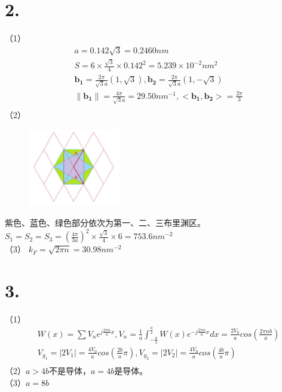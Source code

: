 \documentclass[UTF8]{ctexart}
\begin{document}
\section*{2.}
（1）
\begin{equation*}
    \begin{aligned}
        & a = 0.142\sqrt3=0.2460nm\\
        & S = 6\times\frac{\sqrt3}{4}\times0.142^2=5.239\times10^{-2}nm^2\\
        & \bm{b_1} = \frac{2\pi}{\sqrt3a}(1,\sqrt3),\bm{b_2} = \frac{2\pi}{\sqrt3a}(1,-\sqrt3)\\
        & \lVert \bm{b_1} \rVert = \frac{4\pi}{\sqrt3a} = 29.50nm^{-1}, <\bm{b_1}, \bm{b_2}> = \frac{2\pi}{3}\\
    \end{aligned}
\end{equation*}
（2）
\begin{figure}                               
\includegraphics[width=4cm]{图3.jpg}                  
\caption*{}                                              
\end{figure}                                          
紫色、蓝色、绿色部分依次为第一、二、三布里渊区。\\
$S_1=S_2=S_3=(\frac{4\pi}{3a})^2\times\frac{\sqrt3}{4}\times6=753.6nm^{-2}$\\
（3）
$k_F = \sqrt{2\pi n} = 30.98nm^{-2}$\\
\section*{3.}
（1）
\begin{equation*}
    \begin{aligned}
        &W(x) = \sum V_n e^{j\frac{2\pi n}{a}x}, V_n = \frac{1}{a}\int_{-\frac{a}{2}}^{\frac{a}{2}}W(x)e^{-j\frac{2\pi n}{a}x}dx 
        =\frac{2V_0}{a}cos(\frac{2\pi nb}{a})\\
        &V_{g_1} = \lvert 2V_1\rvert = \frac{4V_0}{a}cos(\frac{2b}{a}\pi), 
        V_{g_2} = \lvert 2V_2\rvert = \frac{4V_0}{a}cos(\frac{4b}{a}\pi)\\
    \end{aligned}
\end{equation*}
（2）$a>4b$不是导体，$a=4b$是导体。\\
（3）$a=8b$\\
\end{document}
